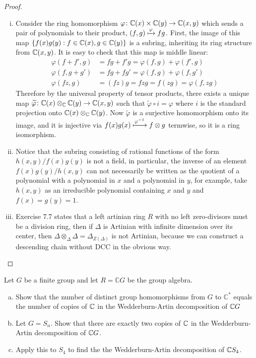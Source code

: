 \documentclass{article}
\begin{document}
\begin{proof}
  \begin{enumerate}[(i)]
    \item Consider the ring homomorphism $\varphi \colon \mathbb C(x) \times \mathbb C(y) \rightarrow \mathbb C(x,y)$
    which sends a pair of polynomials to their product,
    $(f, g) \xmapsto{\varphi} fg$.
    First, the image of this map $\left\{ f(x)g(y): f\in \mathbb C(x), g \in \mathbb C(y) \right\}$
    is a subring, inheriting its ring structure from $\mathbb C(x, y)$.
    It is easy to check that this map is middle linear: \begin{align*}
      \varphi(f + f', g) &= fg + f'g = \varphi(f, g) + \varphi(f', g) \\
      \varphi(f, g + g') &= fg + fg' = \varphi(f, g) + \varphi(f, g') \\
      \varphi(fz, g) &= (fz)g = fzg = f(zg) = \varphi(f, zg)
    \end{align*}
    Therefore by the universal property of tensor products, there exists a
    unique map
      \mbox{$\widetilde\varphi \colon \mathbb C(x) \otimes_\mathbb C  \mathbb C(y) \rightarrow \mathbb C(x, y)$}
    such that $\widetilde\varphi \circ i = \varphi$ where $i$ is the standard
    projection onto $\mathbb C(x) \otimes_\mathbb C \mathbb C(y)$.
    Now $\widetilde\varphi$ is a surjective homomorphism onto its image, and it
    is injective via $f(x)g(x) \xmapsto{\varphi^{-1}} f \otimes g$ termwise,
    so it is a ring isomorphism.
    \item
    Notice that the subring consisting of rational functions of the form
    $h(x,y)/f(x)g(y)$ is not a field, in particular, the inverse of an element
    $f(x)g(y)/h(x,y)$ can not necessarily be written as the quotient of a
    polynomial with a polynomial in $x$ and a polynomial in $y$, for example,
    take $h(x,y)$ as an irreducible polynomial containing $x$ and $y$ and
    $f(x) = g(y) = 1$.
    \item
    Exercise 7.7 states that a left artinian ring $R$ with no left zero-divisors
    must be a division ring, then if $\Delta$ is Artinian with infinite dimension
    over its center, then $\Delta \otimes_\Delta \Delta = \Delta_{Z(\Delta)}$ is
    not Artinian, because we can construct a descending chain without DCC in the
    obvious way.
  \end{enumerate}
\end{proof}
\pagebreak
\begin{problem}{1} %
  Let $G$ be a finite group and let $R = \mathbb CG$ be the group algebra.
  \begin{enumerate}[(a)]
    \item Show that the number of distinct group homomorphisms from $G$ to
    $\mathbb C^*$ equals the number of copies of $\mathbb C$ in the Wedderburn-Artin
    decomposition of $\mathbb C G$
    \item Let $G = S_n$. Show that there are exactly two copies of $\mathbb C$ in the
    Wedderburn-Artin decomposition of $\mathbb C G$.
    \item Apply this to $S_4$ to find the the
    Wedderburn-Artin decomposition of $\mathbb C S_4$.
  \end{enumerate}
\end{problem}
\end{document}
